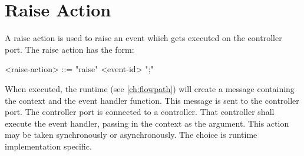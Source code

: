 \section{Raise Action} \label{guide:raise}

A raise action is used to raise an event which gets executed on the controller port. The raise action has the form:

\begin{minip}
\begin{grammar}
<raise-action> ::= "raise" <event-id> ";"
\end{grammar}
\end{minip}

When executed, the runtime (see \ref{ch:flowpath}) will create a message containing the context and the event handler function. This message is sent to the controller port. The controller port is connected to a controller. That controller shall execute the event handler, passing in the context as the argument. This action may be taken synchronously or asynchronously. The choice is runtime implementation specific.


